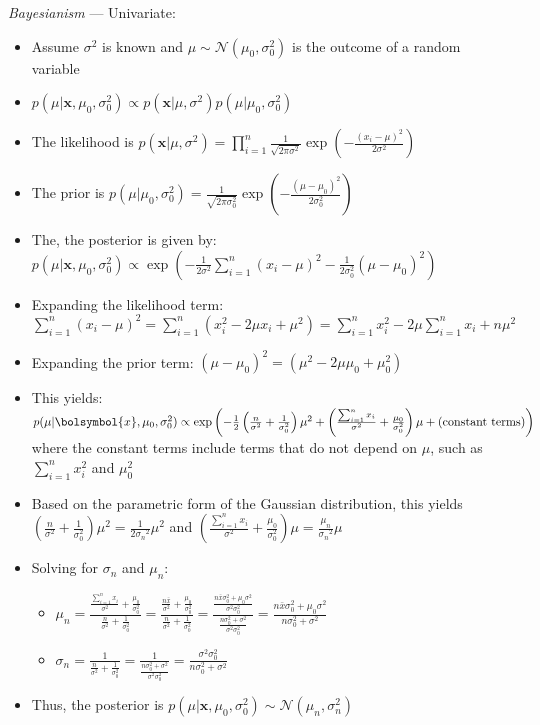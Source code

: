 \emph{Bayesianism} ---
Univariate:
\begin{itemize}
    \item Assume $\sigma^2$ is known and $\mu \sim \mathcal{N}(\mu_0, \sigma_0^2)$ is the outcome of a random variable
    \item $p(\mu | \boldsymbol{x}, \mu_0, \sigma_0^2) \propto p(\boldsymbol{x} | \mu, \sigma^2)p(\mu | \mu_0, \sigma_0^2)$
    \item The likelihood is $p(\boldsymbol{x} | \mu, \sigma^2) = \prod_{i=1}^n \frac{1}{\sqrt{2\pi\sigma^2}} \exp\left(-\frac{(x_i - \mu)^2}{2\sigma^2}\right)$
    \item The prior is $p(\mu | \mu_0, \sigma_0^2) = \frac{1}{\sqrt{2\pi\sigma_0^2}} \exp\left(-\frac{(\mu - \mu_0)^2}{2\sigma_0^2}\right)$
    \item The, the posterior is given by:
    $
    p(\mu | \boldsymbol{x}, \mu_0, \sigma_0^2) \propto \exp\left(-\frac{1}{2\sigma^2} \sum_{i=1}^n (x_i - \mu)^2 - \frac{1}{2\sigma_0^2} (\mu - \mu_0)^2\right)
    $
    \item Expanding the likelihood term:
    $
    \sum_{i=1}^n (x_i - \mu)^2 = \sum_{i=1}^n (x_i^2 - 2\mu x_i + \mu^2) = \sum_{i=1}^n x_i^2 - 2\mu \sum_{i=1}^n x_i + n\mu^2
    $
    \item Expanding the prior term:
    $
    (\mu - \mu_0)^2 = (\mu^2 - 2\mu\mu_0 + \mu_0^2)
    $
    \item This yields:
    $
    p(\mu | \bolsymbol{x}, \mu_0, \sigma_0^2) \propto \exp\left(-\frac{1}{2} \left(\frac{n}{\sigma^2} + \frac{1}{\sigma_0^2}\right)\mu^2 + \left(\frac{\sum_{i=1}^n x_i}{\sigma^2} + \frac{\mu_0}{\sigma_0^2}\right)\mu + \text{(constant terms)}\right)
    $
    where the constant terms include terms that do not depend on $\mu$, such as $\sum_{i=1}^n x_i^2$ and $\mu_0^2$ 
    \item Based on the parametric form of the Gaussian distribution, this yields $\left(\frac{n}{\sigma^2} + \frac{1}{\sigma_0^2}\right)\mu^2 = \frac{1}{2\sigma_n{^2}}\mu^2$ and $\left(\frac{\sum_{i=1}^n x_i}{\sigma^2} + \frac{\mu_0}{\sigma_0^2}\right)\mu = \frac{\mu_n}{\sigma_n{^2}}\mu$
    \item Solving for $\sigma_n$ and $\mu_n$:
    \begin{itemize}
        \item $
        \mu_n = \frac{\frac{\sum_{i=1}^n x_i}{\sigma^2} + \frac{\mu_0}{\sigma_0^2}}{\frac{n}{\sigma^2} + \frac{1}{\sigma_0^2}} = \frac{\frac{n \bar{x}}{\sigma^2} + \frac{\mu_0}{\sigma_0^2}}{\frac{n}{\sigma^2} + \frac{1}{\sigma_0^2}} = \frac{\frac{n \bar{x} \sigma_0^2 + \mu_0 \sigma^2}{\sigma^2 \sigma_0^2}}{\frac{n \sigma_0^2 + \sigma^2}{\sigma^2 \sigma_0^2}} = \frac{n \bar{x} \sigma_0^2 + \mu_0 \sigma^2}{n \sigma_0^2 + \sigma^2}
        $
        \item $
        \sigma_n = \frac{1}{\frac{n}{\sigma^2} + \frac{1}{\sigma_0^2}} = \frac{1}{\frac{n\sigma_0^2 + \sigma^2}{\sigma^2 \sigma_0^2}} = \frac{\sigma^2 \sigma_0^2}{n\sigma_0^2 + \sigma^2}
        $
    \end{itemize}
    \item Thus, the posterior is $p(\mu | \boldsymbol{x}, \mu_0, \sigma_0^2) \sim \mathcal{N}(\mu_n, \sigma_n^{2})$
\end{itemize}
